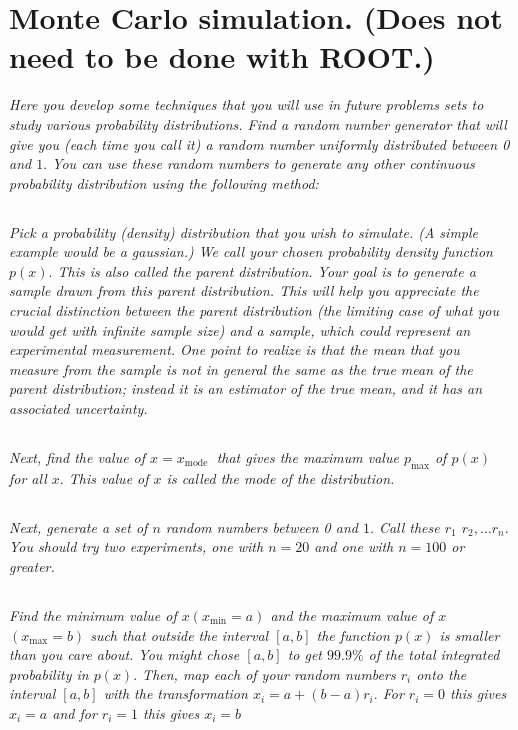 \documentclass{article}
\begin{document}
\newpage


\section{Monte Carlo simulation. (Does not need to be done with ROOT.)}
\textit{ Here you develop some techniques that you will use in future problems sets to study various probability distributions. Find a random number generator that will give you (each time you call it) a random number uniformly distributed between 0 and $1 .$ You can use these random numbers to generate any other continuous probability distribution using the following method:}



\subsection{}
\textit{Pick a probability (density) distribution that you wish to simulate. (A simple example would be a gaussian.) We call your chosen probability density function $p(x) .$ This is also called the parent distribution. Your goal is to generate a sample drawn from this parent distribution. This will help you appreciate the crucial distinction between the parent distribution (the limiting case of what you would get with infinite sample size) and a sample, which could represent an experimental measurement. One point to realize is that the mean that you measure from the sample is not in general the same as the true mean of the parent distribution; instead it is an estimator of the true mean, and it has an associated uncertainty.}


\subsection{}
\textit{Next, find the value of $x=x_{\text {mode }}$ that gives the maximum value $p_{\max }$ of $p(x)$ for all $x .$ This value of $x$ is called the mode of the distribution.}


\subsection{}
\textit{Next, generate a set of $n$ random numbers between 0 and $1 .$ Call these $r_{1}$ $r_{2}, \ldots r_{n} .$ You should try two experiments, one with $n=20$ and one with $n=100$ or greater.}



\subsection{}
\textit{Find the minimum value of $x\left(x_{\min }=a\right)$ and the maximum value of $x$ $\left(x_{\max }=b\right)$ such that outside the interval $[a, b]$ the function $p(x)$ is smaller than you care about. You might chose $[a, b]$ to get $99.9 \%$ of the total integrated probability in $p(x) .$ Then, map each of your random numbers $r_{i}$ onto the interval $[a, b]$ with the transformation $x_{i}=a+(b-a) r_{i} .$ For $r_{i}=0$ this gives $x_{i}=a$ and for $r_{i}=1$ this gives $x_{i}=b$}
\end{document}
